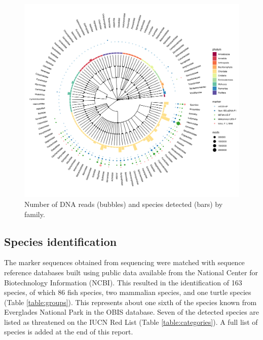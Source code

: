 \documentclass[10pt]{article}
\begin{document}
\begin{figure}[h!]
\centering
\includegraphics[width=\textwidth]{tree}
\caption{Number of DNA reads (bubbles) and species detected (bars) by family.}
\label{fig:tree}
\end{figure}

\clearpage

\subsection*{Species identification}

\begin{multicols}{2}
The marker sequences obtained from sequencing were matched with sequence reference databases built using public data available from the National Center for Biotechnology Information (NCBI). This resulted in the identification of 163 species, of which 86 fish species, two mammalian species, and one turtle species (Table \ref{table:groups}). This represents about one sixth of the species known from Everglades National Park in the OBIS database. Seven of the detected species are listed as threatened on the IUCN Red List (Table \ref{table:categories}). A full list of species is added at the end of this report.
\end{multicols}
\end{document}
